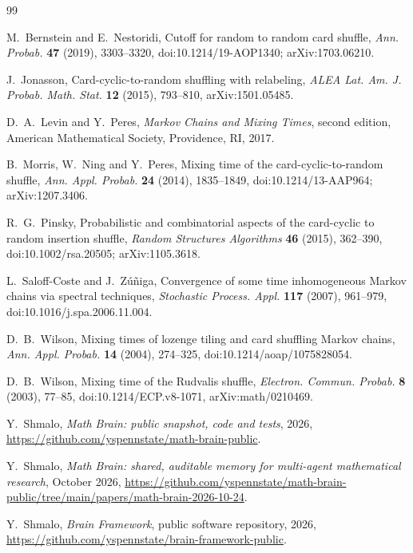 \documentclass[11pt,a4paper]{article}
\numberwithin{equation}{section}
\theoremstyle{remark}
\begin{document}
\begin{thebibliography}{99}

 M.~Bernstein and E.~Nestoridi, Cutoff for random to random card shuffle, \emph{Ann. Probab.} \textbf{47} (2019), 3303--3320, doi:10.1214/19-AOP1340; arXiv:1703.06210.

 J.~Jonasson, Card-cyclic-to-random shuffling with relabeling, \emph{ALEA Lat. Am. J. Probab. Math. Stat.} \textbf{12} (2015), 793--810, arXiv:1501.05485.

 D.~A.~Levin and Y.~Peres, \emph{Markov Chains and Mixing Times}, second edition, American Mathematical Society, Providence, RI, 2017.

 B.~Morris, W.~Ning and Y.~Peres, Mixing time of the card-cyclic-to-random shuffle, \emph{Ann. Appl. Probab.} \textbf{24} (2014), 1835--1849, doi:10.1214/13-AAP964; arXiv:1207.3406.

 R.~G.~Pinsky, Probabilistic and combinatorial aspects of the card-cyclic to random insertion shuffle, \emph{Random Structures Algorithms} \textbf{46} (2015), 362--390, doi:10.1002/rsa.20505; arXiv:1105.3618.

 L.~Saloff-Coste and J.~Z\'u\~niga, Convergence of some time inhomogeneous Markov chains via spectral techniques, \emph{Stochastic Process. Appl.} \textbf{117} (2007), 961--979, doi:10.1016/j.spa.2006.11.004.

 D.~B.~Wilson, Mixing times of lozenge tiling and card shuffling Markov chains, \emph{Ann. Appl. Probab.} \textbf{14} (2004), 274--325, doi:10.1214/aoap/1075828054.

 D.~B.~Wilson, Mixing time of the Rudvalis shuffle, \emph{Electron. Commun. Probab.} \textbf{8} (2003), 77--85, doi:10.1214/ECP.v8-1071, arXiv:math/0210469.

 Y.~Shmalo, \emph{Math Brain: public snapshot, code and tests}, 2026, \url{https://github.com/yspennstate/math-brain-public}.

 Y.~Shmalo, \emph{Math Brain: shared, auditable memory for multi-agent mathematical research}, October 2026, \url{https://github.com/yspennstate/math-brain-public/tree/main/papers/math-brain-2026-10-24}.

 Y.~Shmalo, \emph{Brain Framework}, public software repository, 2026, \url{https://github.com/yspennstate/brain-framework-public}.

\end{thebibliography}
\end{document}
